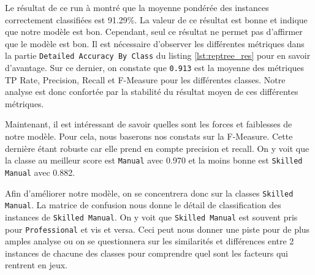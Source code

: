 Le résultat de ce run à montré que la moyenne pondérée des instances correctement classifiées est 91.29\%. La valeur de ce résultat est bonne et indique que notre modèle est bon. Cependant, seul ce résultat ne permet pas d'affirmer que le modèle est bon. Il est nécessaire d'observer les différentes métriques dans la partie \texttt{Detailed Accuracy By Class} du listing \autoref{lst:reptree_res} pour en savoir d'avantage. Sur ce dernier, on constate que \texttt{0.913} est la moyenne des métriques TP Rate, Precision, Recall et F-Measure pour les différentes classes. Notre analyse est donc confortée par la stabilité du résultat moyen de ces différentes métriques.

Maintenant, il est intéressant de savoir quelles sont les forces et faiblesses de notre modèle. Pour cela, nous baserons nos constats sur la F-Measure. Cette dernière étant robuste car elle prend en compte precision et recall. On y voit que la classe au meilleur score est \texttt{Manual} avec 0.970 et la moins bonne est \texttt{Skilled Manual} avec 0.882.

Afin d'améliorer notre modèle, on se concentrera donc sur la classes \texttt{Skilled Manual}. La matrice de confusion nous donne le détail de classification des instances de \texttt{Skilled Manual}. On y voit que \texttt{Skilled Manual} est souvent pris pour \texttt{Professional} et vis et versa. Ceci peut nous donner une piste pour de plus amples analyse ou on se questionnera sur les similarités et différences entre 2 instances de chacune des classes pour comprendre quel sont les facteurs qui rentrent en jeux.

